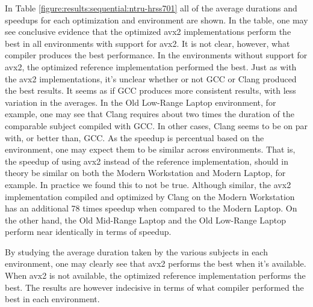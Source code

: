 In Table \ref{figure:results:sequential:ntru-hrss701} all of the average durations and speedups for each optimization and environment are shown. In the table, one may see conclusive evidence that the optimized \gls{avx2} implementations perform the best in all environments with support for \gls{avx2}. It is not clear, however, what compiler produces the best performance. In the environments without support for \gls{avx2}, the optimized reference implementation performed the best. Just as with the \gls{avx2} implementations, it's unclear whether or not GCC or Clang produced the best results. It seems as if GCC produces more consistent results, with less variation in the averages. In the Old Low-Range Laptop environment, for example, one may see that Clang requires about two times the duration of the comparable subject compiled with GCC. In other cases, Clang seems to be on par with, or better than, GCC. As the speedup is percentual based on the environment, one may expect them to be similar across environments. That is, the speedup of using \gls{avx2} instead of the reference implementation, should in theory be similar on both the Modern Workstation and Modern Laptop, for example. In practice we found this to not be true. Although similar, the \gls{avx2} implementation compiled and optimized by Clang on the Modern Workstation has an additional 78 times speedup when compared to the Modern Laptop. On the other hand, the Old Mid-Range Laptop and the Old Low-Range Laptop perform near identically in terms of speedup.



By studying the average duration taken by the various subjects in each environment, one may clearly see that \gls{avx2} performs the best when it's available. When \gls{avx2} is not available, the optimized reference implementation performs the best. The results are however indecisive in terms of what compiler performed the best in each environment.

